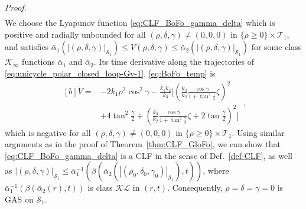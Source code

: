 \documentclass[10pt,a4paper]{amsart}
\newcommand{\abs}[1]{\left\lvert#1\right\rvert}
\renewenvironment{proof}[1][Proof]{\par\pushQED{\qed}\normalfont\textit{#1.}~}{\popQED\par}
\begin{document}
\begin{proof}
\begin{subequations}
\begin{eqnarray}
\end{eqnarray}
\end{subequations}
We choose the Lyapunov function \eqref{eq:CLF_BoFo_gamma_delta} which is positive and radially unbounded for all $(\rho,\delta,\gamma) \ne (0,0,0)$ in $\{\rho \ge 0\} \times \mathcal{T}_1$, and satisfies $ \bar\alpha_1(|(\rho,\delta, \gamma)|_{\mathcal{S}_1}) \le V(\rho,\delta,\gamma) \le \bar\alpha_2(|(\rho,\delta, \gamma)|_{\mathcal{S}_1})$ for some class $\mathcal{K}_{\infty}$ functions $\bar{\alpha}_{1}$ and $\bar{\alpha}_{2}$.
Its time derivative along the trajectories of \eqref{eq:unicycle_polar_closed_loop-Gv-1}, \eqref{eq:BoFo_temp} is
\begin{equation}
\begin{aligned}[b]
\dot V  = &-2k_1 \rho^2 \cos^2 \gamma- \frac{k_1k_2}{k_3}\Biggl[
\left(\frac{k_3}{k_2}\frac{\cos\gamma}{{1+\tan^2\frac{\gamma}{2}}} \zeta\right)^2\\
&+4\tan^2\frac{\gamma}{2}
+ \left(\frac{k_3}{k_2}\frac{\cos\gamma}{{1+\tan^2\frac{\gamma}{2}}}\zeta +2\tan\frac{\gamma}{2} \right)^2
\Biggr]\label{eq:V_dot_forward2}
\end{aligned}\,,
\end{equation}
which is negative for all $(\rho,\delta,\gamma) \ne (0,0,0)$ in $\{\rho \ge 0\} \times \mathcal{T}_1$.
Using similar arguments as in the proof of Theorem~\ref{thm:CLF_GloFo}, we can show that \eqref{eq:CLF_BoFo_gamma_delta} is a CLF in the sense of Def.~\ref{def-CLF}, as well as 
$\abs{(\rho,\delta,\gamma)}_{\mathcal{S}_1} \le \bar{\alpha}_1^{-1}(\beta( \bar{\alpha}_2(\abs{(\rho_0, \delta_0,\gamma_0)}_{\mathcal{S}_1}),t))$, 
where $\bar{\alpha}_1^{-1}(\beta( \bar{\alpha}_2(r),t))$ is class $\mathcal{KL}$ in $(r,t)$.
Consequently, %
$\rho =  \delta = \gamma = 0$ is GAS on $\mathcal{S}_1$.
\end{proof}
\end{document}
